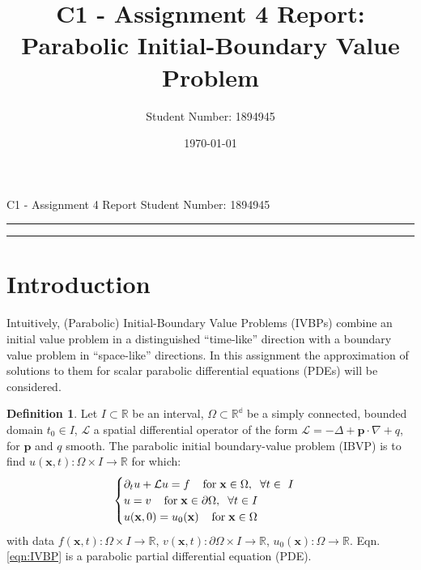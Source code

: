 \documentclass[11pt]{article}
\title{C1 - Assignment 4 Report: Parabolic Initial-Boundary Value Problem} %
\author{Student Number: 1894945} %
\date{\today} %
\theoremstyle{theorem}
\theoremstyle{definition}
\newtheorem{definition}{Definition}
\begin{document}
\maketitle %

\begin{center}
C1 - Assignment 4 Report \hfill
Student Number: 1894945
\vspace{3pt} \hrule \vspace{3pt} \hrule
\end{center}

\tableofcontents

\clearpage



\section{Introduction}
Intuitively, (Parabolic) Initial-Boundary Value Problems (IVBPs) combine an initial value problem in a distinguished “time-like” direction with a boundary value
problem in “space-like” directions. In this assignment the approximation of solutions to them for scalar parabolic differential equations (PDEs) will be considered.

\begin{definition}
	\label{def:IVBP}
	Let $I\subset\mathbb{R}$ be an interval, $\Omega\subset\mathbb{R^d}$ be a simply connected, bounded domain $t_0\in I$, $\mathcal{L}$ a spatial differential operator of the form $\mathcal{L}=-\Delta+\mathbf{p}\cdot\nabla+q$, for $\mathbf{p}$ and $q$ smooth. The parabolic initial boundary-value problem (IBVP) is to find $u(\mathbf{x},t):\Omega\times I\to\mathbb{R}$ for which:
	\begin{align}
		\label{eqn:IVBP}
		\begin{cases}
		\partial_t u+\mathcal{L}u=f\hspace{4mm}\text{for}\hspace{1mm}\mathbf{x}\in\Omega,\hspace{2mm}\forall t\in\ I\\
		u=v\hspace{4mm}\text{for}\hspace{1mm}\mathbf{x}\in\partial\Omega,\hspace{2mm}\forall t\in I\\
		u(\mathbf{x},0)=u_0(\mathbf{x})\hspace{4mm}\text{for}\hspace{1mm}\mathbf{x}\in\Omega
		\end{cases}
	\end{align} 
	with data $f(\mathbf{x},t):\Omega\times I\to\mathbb{R}$, $v(\mathbf{x},t):\partial\Omega\times I\to\mathbb{R}$, $u_0(\mathbf{x}):\Omega\to\mathbb{R}$. Eqn.\eqref{eqn:IVBP} is a parabolic partial differential equation (PDE).\\
\end{definition}
\end{document}
